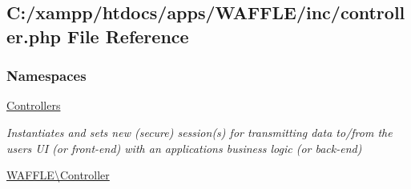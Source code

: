 \hypertarget{controller_8php}{}\subsection{C\+:/xampp/htdocs/apps/\+W\+A\+F\+F\+L\+E/inc/controller.php File Reference}
\label{controller_8php}
\subsubsection*{Namespaces}
\begin{DoxyCompactItemize}
\item 
 \hyperlink{namespace_controllers}{Controllers}
\begin{DoxyCompactList}\small\item\em Instantiates and sets new (secure) session(s) for transmitting data to/from the user\textquotesingle{}s UI (or front-\/end) with an application\textquotesingle{}s business logic (or back-\/end) \end{DoxyCompactList}\item 
 \hyperlink{namespace_w_a_f_f_l_e_1_1_controller}{W\+A\+F\+F\+L\+E\textbackslash{}\+Controller}
\end{DoxyCompactItemize}
